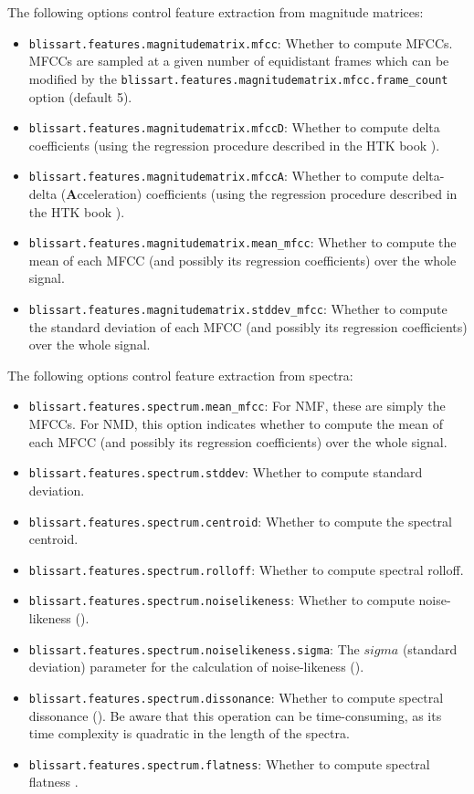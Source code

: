 The following options control feature extraction from magnitude matrices:
\begin{itemize}
  \item {\tt blissart.features.magnitudematrix.mfcc}: Whether to compute
    MFCCs. MFCCs are sampled at a given number of equidistant frames which can
    be modified by the {\tt blissart.features.magnitudematrix.mfcc.frame\_count}
    option (default 5).
  \item {\tt blissart.features.magnitudematrix.mfccD}: Whether to compute delta
    coefficients (using the regression procedure described in the HTK book
    \cite{HTKBook}).
  \item {\tt blissart.features.magnitudematrix.mfccA}: Whether to compute
    delta-delta ({\bf A}cceleration) coefficients (using the regression
    procedure described in the HTK book \cite{HTKBook}).
  \item {\tt blissart.features.magnitudematrix.mean\_mfcc}: Whether to compute
	the mean of each MFCC (and possibly its regression coefficients) over the
    whole signal.
  \item {\tt blissart.features.magnitudematrix.stddev\_mfcc}: Whether to compute
    the standard deviation of each MFCC (and possibly its regression 
    coefficients) over the whole signal.
\end{itemize}


The following options control feature extraction from spectra:
\begin{itemize}
  \item {\tt blissart.features.spectrum.mean\_mfcc}: For NMF, these are simply
    the MFCCs. For NMD, this option indicates whether to compute
	the mean of each MFCC (and possibly its regression coefficients) over the
    whole signal.
  \item {\tt blissart.features.spectrum.stddev}: Whether to compute standard
    deviation.
  \item {\tt blissart.features.spectrum.centroid}: Whether to compute the
    spectral centroid.
  \item {\tt blissart.features.spectrum.rolloff}: Whether to compute spectral
    rolloff.
  \item {\tt blissart.features.spectrum.noiselikeness}: Whether to compute
    noise-likeness (\cite{Uhle2003}).
  \item {\tt blissart.features.spectrum.noiselikeness.sigma}: The $sigma$
    (standard deviation) parameter for the calculation of noise-likeness
    (\cite{Uhle2003}).
  \item {\tt blissart.features.spectrum.dissonance}: Whether to compute spectral
    dissonance (\cite{Uhle2003}).  Be aware that this operation can be
    time-consuming, as its time complexity is quadratic in the length of the
    spectra.
  \item {\tt blissart.features.spectrum.flatness}: Whether to compute spectral
    flatness \cite{Uhle2003}.
\end{itemize}

